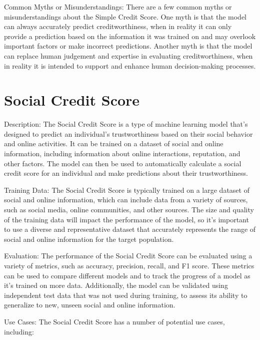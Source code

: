 \begin{itemize}
{Common Myths or Misunderstandings:
There are a few common myths or misunderstandings about the Simple Credit Score. One myth is that the model can always accurately predict creditworthiness, when in reality it can only provide a prediction based on the information it was trained on and may overlook important factors or make incorrect predictions. Another myth is that the model can replace human judgement and expertise in evaluating creditworthiness, when in reality it is intended to support and enhance human decision-making processes.

\section{Social Credit Score}

Description:
The Social Credit Score is a type of machine learning model that's designed to predict an individual's trustworthiness based on their social behavior and online activities. It can be trained on a dataset of social and online information, including information about online interactions, reputation, and other factors. The model can then be used to automatically calculate a social credit score for an individual and make predictions about their trustworthiness.

Training Data:
The Social Credit Score is typically trained on a large dataset of social and online information, which can include data from a variety of sources, such as social media, online communities, and other sources. The size and quality of the training data will impact the performance of the model, so it's important to use a diverse and representative dataset that accurately represents the range of social and online information for the target population.

Evaluation:
The performance of the Social Credit Score can be evaluated using a variety of metrics, such as accuracy, precision, recall, and F1 score. These metrics can be used to compare different models and to track the progress of a model as it's trained on more data. Additionally, the model can be validated using independent test data that was not used during training, to assess its ability to generalize to new, unseen social and online information.

Use Cases:
The Social Credit Score has a number of potential use cases, including:

}
\end{itemize}
